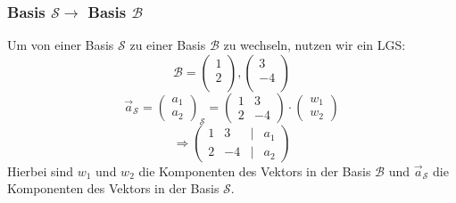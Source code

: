 \documentclass{article}
\begin{document}
\begin{minipage}[t]{0.45\textwidth}
    \subsubsection*{Basis $\mathcal{S} \to$ Basis $\mathcal{B}$}
    Um von einer Basis \( \mathcal{S} \) zu einer Basis \( \mathcal{B} \) zu wechseln, nutzen wir ein LGS:
    \begin{equation*}
        \mathcal{B} = \begin{pmatrix}
            1 \\
            2 \\
            \end{pmatrix}, \begin{pmatrix}
                3 \\
                -4 \\
            \end{pmatrix}
    \end{equation*}
    \begin{equation*}
        \vec{a}_{\mathcal{S}} = \begin{pmatrix}
            a_1 \\
            a_2
        \end{pmatrix}_{\mathcal{S}}
        = \begin{pmatrix}
            1 & 3 \\
            2 & -4
        \end{pmatrix}
        \cdot
        \begin{pmatrix}
            w_1 \\
            w_2
        \end{pmatrix}
    \end{equation*}
    \begin{equation*}
        \Rightarrow
        \begin{pmatrix}
            1 & 3 & | & a_1 \\
            2 & -4 & | & a_2
        \end{pmatrix}
    \end{equation*}
    Hierbei sind \( w_1 \) und \( w_2 \) die Komponenten des Vektors in der Basis \( \mathcal{B} \) und $\vec{a}_{\mathcal{S}} $ die Komponenten des Vektors in der Basis \( \mathcal{S} \).

\end{minipage}
\hfill
\end{document}
